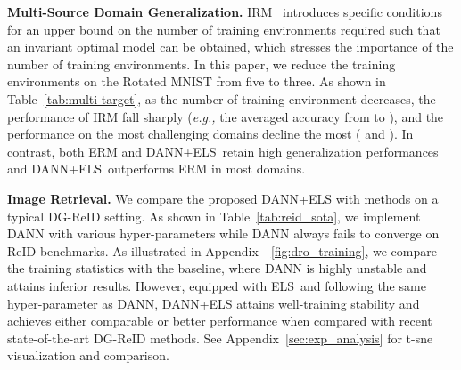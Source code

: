 \documentclass{article} \usepackage{iclr2023_conference,times}
\newcommand{\abbr}[0]{DANN+ELS\xspace}
\newcommand{\ls}[0]{ELS\xspace}
\newcommand{\eg}[0]{\textit{e.g., }}
\begin{document}
\noindent\textbf{Multi-Source Domain Generalization.} IRM~\citep{arjovsky2020invariant} introduces specific conditions for an upper bound on the number of training environments required such that an invariant optimal model can be obtained, which stresses the importance of the number of training environments. In this paper, we reduce the training environments on the Rotated MNIST from five to three. As shown in Table~\ref{tab:multi-target}, as the number of training environment decreases, the performance of IRM fall sharply (\eg the averaged accuracy from  to ), and the performance on the most challenging domains  decline the most ( and ). In contrast, both ERM and \abbr~retain high generalization performances and \abbr~outperforms ERM in most domains. 

\textbf{Image Retrieval.} We compare the proposed \abbr with methods on a typical DG-ReID setting. As shown in Table~\ref{tab:reid_sota}, we implement DANN with various hyper-parameters while DANN always fails to converge on ReID benchmarks. As illustrated in Appendix~\figurename~\ref{fig:dro_training}, we compare the training statistics with the baseline, where DANN is highly unstable and attains inferior results. However, equipped with \ls~and following the same hyper-parameter as DANN, \abbr attains well-training stability and achieves either comparable or better performance when compared with recent state-of-the-art DG-ReID methods. See Appendix~\ref{sec:exp_analysis} for t-sne visualization and comparison.
\end{document}
